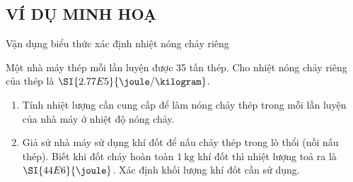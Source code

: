 \subsection{VÍ DỤ MINH HOẠ}
\begin{dang}{Vận dụng biểu thức xác định nhiệt nóng chảy riêng}
\end{dang}
\begin{vd}
Một nhà máy thép mỗi lần luyện được 35 tấn thép. Cho nhiệt nóng chảy riêng của thép là $\SI{2.77E5}{\joule/\kilogram}$.
		\begin{enumerate}[label=\alph*)]
			\item Tính nhiệt lượng cần cung cấp để làm nóng chảy thép trong mỗi lần luyện của nhà máy ở nhiệt độ nóng chảy.
			\item Giả sử nhà máy sử dụng khí đốt để nấu chảy thép trong lò thổi (nồi nấu thép). Biết khi đốt cháy hoàn toàn $\SI{1}{\kilogram}$ khí đốt thì nhiệt lượng toả ra là $\SI{44E6}{\joule}$. Xác định khối lượng khí đốt cần sử dụng.
		\end{enumerate}

\end{vd}
	

